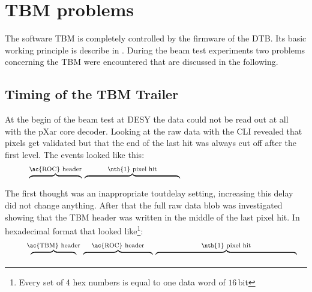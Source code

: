 \documentclass[british,11pt,a4paper]{memoir}
\begin{document}
\section{\ac{TBM} problems}\label{stbmprob}
The software \ac{TBM} is completely controlled by the firmware of the \ac{DTB}. Its basic working principle is describe in . During the beam test experiments two problems concerning the \ac{TBM} were encountered that are discussed in the following.
\subsection{Timing of the \ac{TBM} Trailer}
At the begin of the beam test at \ac{DESY} the data could not be read out at all with the pXar core decoder. Looking at the raw data with the \ac{CLI} revealed that pixels get validated but that the end of the last hit was always cut off after the first level. The events looked like this:
\begin{equation*}
	\overbrace{\hspace*{2.2cm}}^{\z{\ac{ROC} header}}\hspace*{2pt}\overbrace{\hspace*{4cm}}^{\z{\nth{1} pixel hit}}\hspace*{4.3cm}
\end{equation*}
\vspace*{-1.1cm}
\termi{[-205, -8, 36, -2, 54, -46, 148, -4, 78, 103]}
The first thought was an inappropriate toutdelay setting, increasing this delay did not change anything. After that the full raw data blob was investigated showing that the \ac{TBM} header was written in the middle of the last pixel hit. In hexadecimal format that looked like\footnote{Every set of 4 hex numbers is equal to one data word of $16\,$bit}:
\begin{equation*}
	\hspace*{0.5cm}\overbrace{\hspace*{1.9cm}}^{\z{\ac{TBM} header}}\hspace*{2pt}\overbrace{\hspace*{2.9cm}}^{\z{\ac{ROC} header}}\hspace*{2pt}\overbrace{\hspace*{5.9cm}}^{\z{\nth{1} pixel hit}}
\end{equation*}
\vspace*{-1.1cm}
\end{document}
